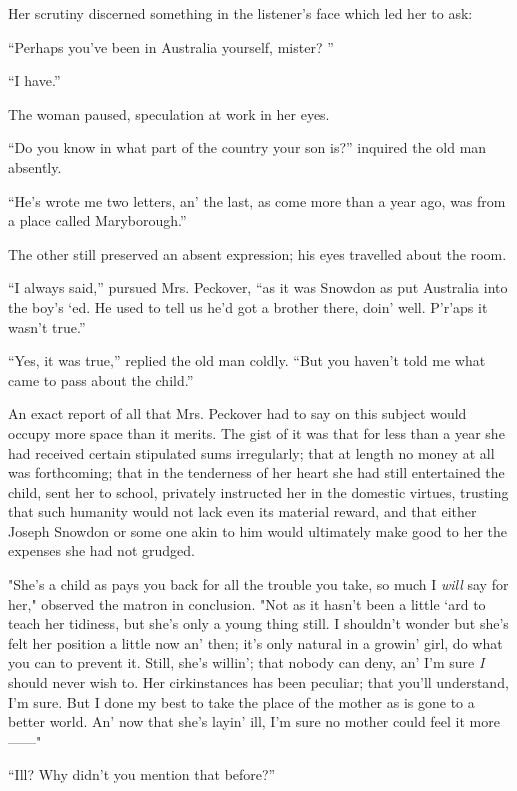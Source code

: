 Her scrutiny discerned something in the listener's face which led her to
ask:

``Perhaps you've been in Australia yourself, mister? ''

``I have.''

The woman paused, speculation at work in her eyes.

``Do you know in what part of the country your son is?'' inquired the
old man absently.

{\protect\hypertarget{113}{}{}}``He's wrote me two letters, an' the
last, as come more than a year ago, was from a place called
Maryborough.''

The other still preserved an absent expression; his eyes travelled about
the room.

``I always said,'' pursued Mrs. Peckover, ``as it was Snowdon as put
Australia into the boy's `ed. He used to tell us he'd got a brother
there, doin' well. P'r'aps it wasn't true.''

``Yes, it was true,'' replied the old man coldly. ``But you haven't told
me what came to pass about the child.''

An exact report of all that Mrs. Peckover had to say on this subject
would occupy more space than it merits. The gist of it was that for less
than a year she had received certain stipulated sums irregularly; that
at length no money at all was forthcoming; that in the tenderness of her
heart she had still entertained the child, sent her to school, privately
instructed her in the domestic virtues, trusting that such humanity
would not lack even its material reward, and that either Joseph
{\protect\hypertarget{114}{}{}}Snowdon or some one akin to him would
ultimately make good to her the expenses she had not grudged.

"She's a child as pays you back for all the trouble you take, so much I
\emph{will} say for her," observed the matron in conclusion. "Not as it
hasn't been a little `ard to teach her tidiness, but she's only a young
thing still. I shouldn't wonder but she's felt her position a little now
an' then; it's only natural in a growin' girl, do what you can to
prevent it. Still, she's willin'; that nobody can deny, an' I'm sure
\emph{I} should never wish to. Her cirkinstances has been peculiar; that
you'll understand, I'm sure. But I done my best to take the place of the
mother as is gone to a better world. An' now that she's layin' ill, I'm
sure no mother could feel it more{{------}}"

``Ill? Why didn't you mention that before?''

